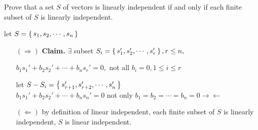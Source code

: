 Prove that a set $S$ of vectors is linearly independent if and only if each finite subset of $S$ is linearly independent.

\begin{tcolorbox}
	\begin{solution}
		let $S = \left\{ \,s_1,s_2,\cdots,s_n \,\right\}$\\
		\begin{enumerate}
			\item[$(\Rightarrow)$] \textbf{Claim.} $\exists$ subset $S_i = \left\{ \,s_1',s_2',\cdots,s_r' \,\right\}, r \leq n,$ 
			
			$ b_1s_1'+b_2s_2'+\cdots + b_ns_r' = 0,$ not all $b_i = 0, 1 \leq i \leq r$
			
			
			let $S-S_i = \left\{ \,s_{r+1}',s_{r+2}',\cdots,s_{n}' \,\right\}$\\
			$b_1s_1'+b_2s_2'+\cdots+b_ns_n' = 0$ not only $b_1 = b_2 = \cdots = b_n = 0  \rightarrow\leftarrow$
			
			\item[$(\Leftarrow)$] by definition of linear independent, each finite subset of $S$ is linearly independent, $S$ is linear independent.
		\end{enumerate}
	\end{solution}
\end{tcolorbox}